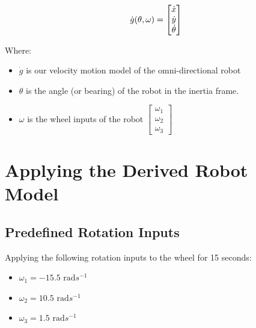\documentclass{article}
\begin{document}
\begin{equation}
	\vspace{-0.4cm}
	\dot{g}(\theta, \omega) 
		= 
		\begin{bmatrix}
			\dot{x} \\
			\dot{y} \\
			\dot{\theta}
		\end{bmatrix} 
\end{equation}

Where: 

\begin{itemize}
	\vspace{-0.4cm}
	\setlength{\itemsep}{0pt}
	\setlength{\parskip}{0pt}
	\setlength{\parsep}{0pt}
	
	\item{$\dot{g}$ is our velocity motion model of the omni-directional robot}
	\item{$\theta$ is the angle (or bearing) of the robot in the inertia frame.}
	\item{$\omega$ is the wheel inputs of the robot 
		$\begin{bmatrix}
			\omega_{1} \\ 
			\omega_{2} \\ 
			\omega_{3}
		\end{bmatrix}$
	}
\end{itemize}






\newpage
\section{Applying the Derived Robot Model}
\label{sec:applying_motion_model}



\subsection{Predefined Rotation Inputs}
\label{subsec:traverse_inputs}
Applying the following rotation inputs to the wheel for 15 seconds:

\begin{itemize}
	\vspace{-0.4cm}
	\setlength{\itemsep}{0pt}
	\setlength{\parskip}{0pt}
	\setlength{\parsep}{0pt}
	
	\item{$\omega_{1} = -15.5 \text{ rad} s^{-1}$}
	\item{$\omega_{2} = 10.5 \text{ rad} s^{-1}$}
	\item{$\omega_{3} = 1.5 \text{ rad} s^{-1}$}
	
	\vspace{-0.4cm}
\end{itemize}
\end{document}
